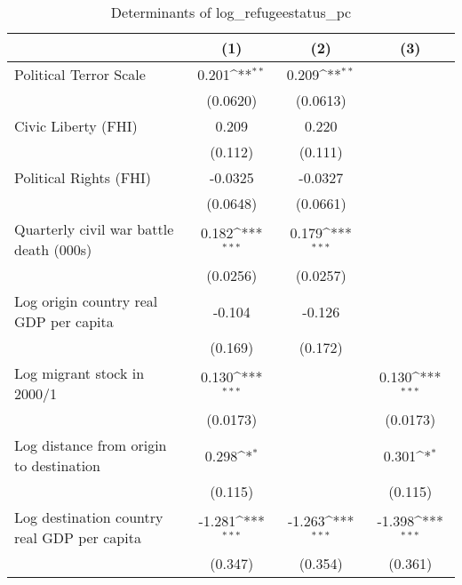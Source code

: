 \begin{table}[htbp]\centering
\def\sym#1{\ifmmode^{#1}\else\(^{#1}\)\fi}
\caption{Determinants of log\_refugeestatus\_pc}
\begin{tabular}{l*{3}{c}}
\hline\hline
                    &\multicolumn{1}{c}{(1)}         &\multicolumn{1}{c}{(2)}         &\multicolumn{1}{c}{(3)}         \\
\hline
Political Terror Scale&       0.201\sym{**} &       0.209\sym{**} &                     \\
                    &    (0.0620)         &    (0.0613)         &                     \\
[1em]
Civic Liberty (FHI) &       0.209         &       0.220         &                     \\
                    &     (0.112)         &     (0.111)         &                     \\
[1em]
Political Rights (FHI)&     -0.0325         &     -0.0327         &                     \\
                    &    (0.0648)         &    (0.0661)         &                     \\
[1em]
Quarterly civil war battle death (000s)&       0.182\sym{***}&       0.179\sym{***}&                     \\
                    &    (0.0256)         &    (0.0257)         &                     \\
[1em]
Log origin country real GDP per capita&      -0.104         &      -0.126         &                     \\
                    &     (0.169)         &     (0.172)         &                     \\
[1em]
Log migrant stock in 2000/1&       0.130\sym{***}&                     &       0.130\sym{***}\\
                    &    (0.0173)         &                     &    (0.0173)         \\
[1em]
Log distance from origin to destination&       0.298\sym{*}  &                     &       0.301\sym{*}  \\
                    &     (0.115)         &                     &     (0.115)         \\
[1em]
Log destination country real GDP per capita&      -1.281\sym{***}&      -1.263\sym{***}&      -1.398\sym{***}\\
                    &     (0.347)         &     (0.354)         &     (0.361)         \\

\end{tabular}
\end{table}
